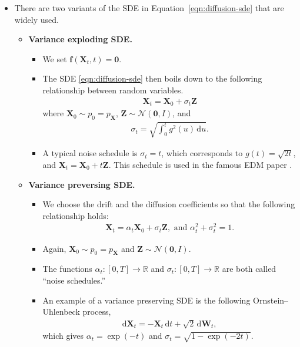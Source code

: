 \documentclass[10pt]{article}
\newcommand{\dee}{\mathrm{d}}
\newcommand{\ve}[1]{\mathbf{#1}}
\newcommand{\ra}{\rightarrow}
\newcommand{\mcal}[1]{\mathcal{#1}}
\newcommand{\Real}{\mathbb{R}}
\begin{document}
\begin{itemize}
  \item There are two variants of the SDE in Equation~\ref{eqn:diffusion-sde} that are widely used.
  \begin{itemize}
    \item \textbf{Variance exploding SDE.} 
    \begin{itemize}
      \item We set $\ve{f}(\ve{X}_t,t) = \ve{0}$.
      \item The SDE \eqref{eqn:diffusion-sde} then boils down to the following relationship between random variables.
      \begin{align*}
        \ve{X}_t = \ve{X}_0 + \sigma_t \ve{Z}
      \end{align*}
      where $\ve{X}_0 \sim p_0 = p_\ve{X}$, $\ve{Z} \sim \mcal{N}(\ve{0},I)$, and 
      \begin{align*}
        \sigma_t = \sqrt{\int_0^t g^2(u)\, \dee u}.
      \end{align*}
      \item A typical noise schedule is $\sigma_t = t$, which corresponds to $g(t) = \sqrt{2t}$, and $\ve{X}_t = \ve{X}_0 + t\ve{Z}$. This schedule is used in the famous EDM paper \cite{Karras:EDM:2022}.
    \end{itemize}    

    \item \textbf{Variance preversing SDE.}
    \begin{itemize}
      \item We choose the drift and the diffusion coefficients so that the following relationship holds:
      \begin{align*}
        \ve{X}_t = \alpha_t \ve{X}_0 + \sigma_t \ve{Z}, \mbox{ and } \alpha_t^2 + \sigma_t^2 = 1.
      \end{align*}
      
      \item Again, $\ve{X}_0 \sim p_0 = p_\ve{X}$ and $\ve{Z} \sim \mcal{N}(\ve{0},I)$. 
      
      \item The functions $\alpha_t: [0,T] \ra \Real$ and $\sigma_t: [0,T] \ra \Real$ are both called ``noise schedules.''

      \item An example of a variance preserving SDE is the following Ornstein--Uhlenbeck process,
      \begin{align*}
        \dee\ve{X}_t = -\ve{X}_t\, \dee t + \sqrt{2}\, \dee \ve{W}_t,
      \end{align*}
      which gives $\alpha_t = \exp(-t)$ and $\sigma_t = \sqrt{1 - \exp(-2t)}$.
    \end{itemize}    
  \end{itemize}


\end{itemize}
\end{document}

